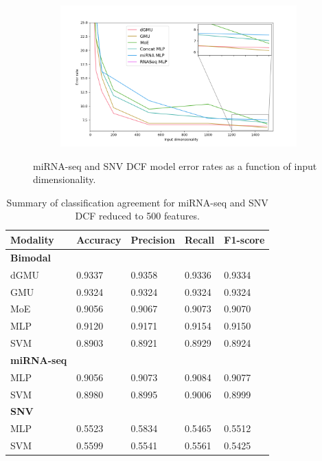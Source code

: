 \begin{figure}[H]
     \centering
     \begin{subfigure}[b]{\textwidth}
         \centering
         \includegraphics[width=\textwidth]{img/m_s/exp92.png}
     \end{subfigure}
        \caption{miRNA-seq and SNV DCF model error rates as a function of input dimensionality.}
        \label{fig:m_s_dcf_exp92}
\end{figure}

\begin{table}[H]
   \caption{Summary of classification agreement for miRNA-seq and SNV DCF reduced to 500 features.} 
   \small %
   \centering %
   \begin{tabular}{lllll} %
   \toprule[\heavyrulewidth]\toprule[\heavyrulewidth]
   \textbf{Modality} & \textbf{Accuracy} & \textbf{Precision} & \textbf{Recall} & \textbf{F1-score} \\ 
   \midrule
   \multicolumn{1}{l}{\textbf{Bimodal}} \\
        dGMU & 0.9337 & 0.9358 & 0.9336 & 0.9334\\
        GMU  & 0.9324 & 0.9324 & 0.9324 & 0.9324\\
        MoE  & 0.9056 & 0.9067 & 0.9073 & 0.9070\\
        MLP  & 0.9120 & 0.9171 & 0.9154 & 0.9150\\
        SVM  & 0.8903 & 0.8921 & 0.8929 & 0.8924\\
   \midrule
   \multicolumn{1}{l}{\textbf{miRNA-seq}} \\
        MLP  & 0.9056 & 0.9073 & 0.9084 & 0.9077\\
        SVM  & 0.8980 & 0.8995 & 0.9006 & 0.8999\\
   \midrule
   \multicolumn{1}{l}{\textbf{SNV}}  \\
        MLP  & 0.5523 & 0.5834 & 0.5465 & 0.5512\\
        SVM  & 0.5599 & 0.5541 & 0.5561 & 0.5425\\
   \bottomrule[\heavyrulewidth] 
   \end{tabular}
   \label{table:m_s_dcf_summary}
\end{table}


